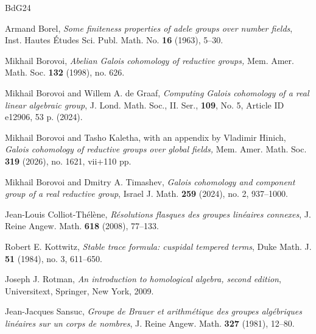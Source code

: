 \documentclass[11pt]{amsart}
\theoremstyle{plain}
\theoremstyle{definition}
\begin{document}
\begin{thebibliography}{BdG24}

Armand Borel,
{\em Some finiteness properties of adele groups over number fields},
Inst. Hautes Études Sci. Publ. Math. No. {\bf 16} (1963), 5--30.
\sk

Mikhail Borovoi,
{\em Abelian Galois cohomology of reductive groups,}
Mem. Amer. Math. Soc. {\bf 132} (1998), no. 626.
\sk

Mikhail Borovoi and Willem A. de Graaf,
{\em Computing Galois cohomology of a real linear algebraic group},
J. Lond. Math. Soc., II. Ser., {\bf 109}, No. 5, Article ID e12906, 53 p. (2024).
\sk

Mikhail Borovoi and Tasho Kaletha,
with an appendix by Vladimir Hinich,
{\em Galois cohomology of reductive groups over global fields,}
Mem. Amer. Math. Soc. {\bf 319} (2026), no. 1621, vii+110 pp.
\sk

Mikhail Borovoi and Dmitry A. Timashev,
{\em Galois cohomology and component group of a real reductive group},
Israel J. Math. {\bf 259} (2024), no. 2, 937--1000.
\sk

Jean-Louis Colliot-Th\'el\`ene,
{\em R\'esolutions flasques des groupes lin\'eaires connexes},
J. Reine Angew. Math. {\bf 618} (2008), 77--133.

Robert E. Kottwitz,
{\em Stable trace formula: cuspidal tempered terms},
Duke Math. J. {\bf 51} (1984), no. 3, 611--650.
\sk

 Joseph J. Rotman,
{\em An introduction to homological algebra,
second edition},
Universitext,
Springer, New York, 2009.
\sk

Jean-Jacques Sansuc, \emph{Groupe de {B}rauer et arithm\'etique des groupes
alg\'ebriques lin\'eaires sur un corps de nombres}, J. Reine Angew. Math.
{\bf 327} (1981), 12--80.

\end{thebibliography}
\end{document}
